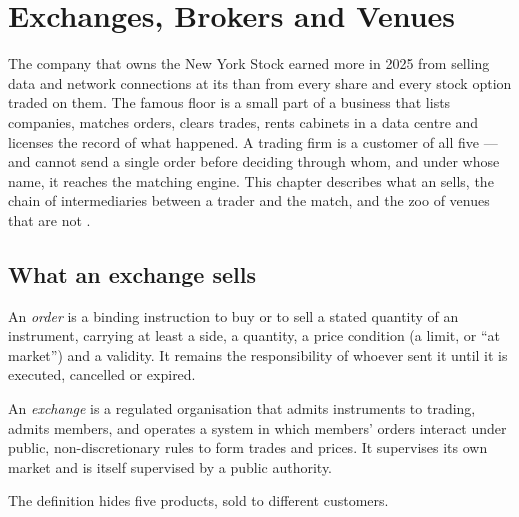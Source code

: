 \chapter{Exchanges, Brokers and Venues}\label{ch:m1:exchanges-brokers-venues}

The company that owns the New York Stock  earned more in 2025 from
selling data and network connections at its  than from every share
and every stock option traded on them. The famous floor is a small part of a
business that lists companies, matches orders, clears trades, rents cabinets
in a data centre and licenses the record of what happened. A trading firm is
a customer of all five --- and cannot send a single order before deciding
through whom, and under whose name, it reaches the matching engine. This
chapter describes what an  sells, the chain of intermediaries
between a trader and the match, and the zoo of venues that are not
.

\section{What an exchange sells}

\begin{definition}[Order]\label{def:m1:exchanges-brokers-venues:order}
An \emph{order} is a binding instruction to buy or to sell a
stated quantity of an instrument, carrying at least a side, a quantity, a
price condition (a limit, or ``at market'') and a validity. It remains the
responsibility of whoever sent it until it is executed, cancelled or expired.
\end{definition}

\begin{definition}[Exchange]\label{def:m1:exchanges-brokers-venues:exchange}
An \emph{exchange} is a regulated organisation that admits
instruments to trading, admits members, and operates a system in which
members' orders interact under public, non-discretionary rules to form
trades and prices. It supervises its own market and is itself supervised by
a public authority.
\end{definition}

The definition hides five products, sold to different customers.

